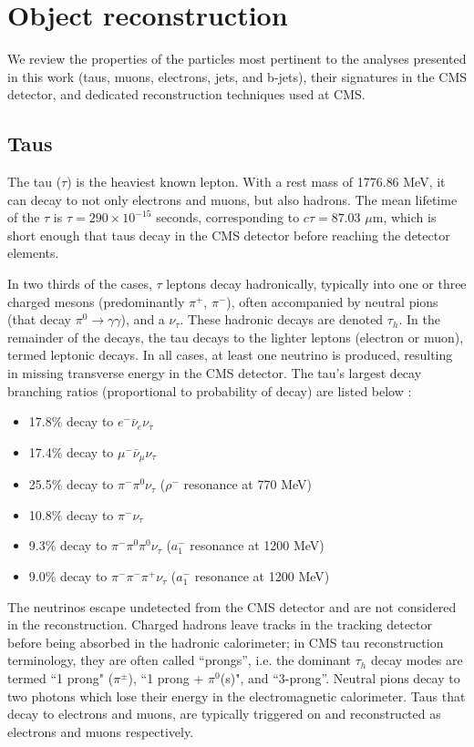 \section{Object reconstruction}

We review the properties of the particles most pertinent to the analyses presented in this work (taus, muons, electrons, jets, and b-jets), their signatures in the CMS detector, and dedicated reconstruction techniques used at CMS.

\subsection{Taus}
The tau ($\tau$) is the heaviest known lepton. With a rest mass of 1776.86 MeV, it can decay to not only electrons and muons, but also hadrons. The mean lifetime of the $\tau$ is $\tau = 290 \times 10^{-15}$ seconds, corresponding to $c\tau = 87.03$ $\mu$m, which is short enough that taus decay in the CMS detector before reaching the detector elements. 

In two thirds of the cases, $\tau$ leptons decay hadronically, typically into one or three charged mesons (predominantly $\pi^+$, $\pi^-$), often accompanied by neutral pions (that decay $\pi^0 \rightarrow \gamma\gamma$), and a $\nu_{\tau}$. These hadronic decays are denoted $\tau_{h}$. In the remainder of the decays, the tau decays to the lighter leptons (electron or muon), termed leptonic decays. In all cases, at least one neutrino is produced, resulting in missing transverse energy in the CMS detector. The tau's largest decay branching ratios (proportional to probability of decay) are listed below \citep{workman_review_2022}: 
\begin{itemize}
    \item 17.8\% decay to $e^- \bar{\nu}_e \nu_{\tau}$
    \item 17.4\% decay to $\mu^- \bar{\nu}_\mu \nu_{\tau}$
    \item 25.5\% decay to $\pi^- \pi^0 \nu_{\tau}$ ($\rho^-$ resonance at 770 MeV)
    \item 10.8\% decay to $\pi^- \nu_{\tau}$ %
    \item 9.3\% decay to $\pi^- \pi^0 \pi^0 \nu_{\tau}$  ($a_1^-$ resonance at 1200 MeV)
    \item 9.0\% decay to $\pi^- \pi^- \pi^+ \nu_{\tau}$ ($a_1^-$ resonance at 1200 MeV)
\end{itemize}

The neutrinos escape undetected from the CMS detector and are not considered in the reconstruction. Charged hadrons leave tracks in the tracking detector before being absorbed in the hadronic calorimeter; in CMS tau reconstruction terminology, they are often called ``prongs'', i.e. the dominant $\tau_{h}$ decay modes are termed ``1 prong" ($\pi^\pm$), ``1 prong + $\pi^0$(s)", and ``3-prong''. Neutral pions decay to two photons which lose their energy in the electromagnetic calorimeter. Taus that decay to electrons and muons, are typically triggered on and reconstructed as electrons and muons respectively. 

